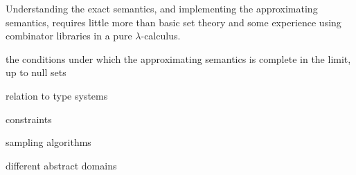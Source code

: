 \documentclass{llncs}
\begin{document}
Understanding the exact semantics, and implementing the approximating semantics, requires little more than basic set theory and some experience using combinator libraries in a pure $\lambda$-calculus.

the conditions under which the approximating semantics is complete in the limit, up to null sets

relation to type systems

constraints

sampling algorithms

different abstract domains









\end{document}
